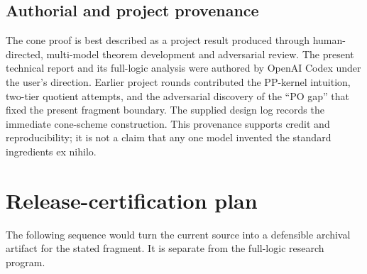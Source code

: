 \documentclass[11pt]{article}
\begin{document}
\subsection{Authorial and project provenance}

The cone proof is best described as a project result produced through human-directed,
multi-model theorem development and adversarial review. The present technical report
and its full-logic analysis were authored by OpenAI Codex under the user's direction.
Earlier project rounds contributed the PP-kernel intuition, two-tier quotient attempts,
and the adversarial discovery of the ``PO gap'' that fixed the present fragment
boundary. The supplied design log records the immediate cone-scheme construction. This
provenance supports credit and reproducibility; it is not a claim that any one model
invented the standard ingredients ex nihilo.

\section{Release-certification plan}

The following sequence would turn the current source into a defensible archival
artifact for the stated fragment. It is separate from the full-logic research program.
\end{document}
